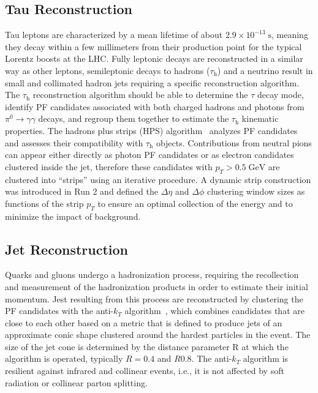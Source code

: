 \subsection{Tau Reconstruction}
\label{sec:tau_reco}

Tau leptons are characterized by a mean lifetime of about $2.9\times10^{-13}\;\text{s}$, meaning they decay within a few millimeters from their production point for the typical Lorentz boosts at the LHC. Fully leptonic decays are reconstructed in a similar way as other leptons, semileptonic decays to hadrons ($\tau_\text{h}$) and a neutrino result in small and collimated hadron jets requiring a specific reconstruction algorithm. The $\tau_\text{h}$ reconstruction algorithm should be able to determine the $\tau$ decay mode, identify PF candidates associated with both charged hadrons and photons from $\pi^0 \rightarrow \gamma\gamma$ decays, and regroup them together to estimate the $\tau_\text{h}$ kinematic properties. The hadrons plus strips (HPS) algorithm~\cite{CMS:2011eio,CMS:2015pac} analyzes PF candidates and assesses their compatibility with $\tau_\text{h}$ objects. Contributions from neutral pions can appear either directly as photon PF candidates or as electron candidates clustered inside the jet, therefore these candidates with $p_T > 0.5 \;\text{GeV}$ are clustered into ``strips'' using an iterative procedure. A dynamic strip construction was introduced in Run 2 and defined the $\Delta\eta$ and $\Delta\phi$ clustering window sizes as functions of the strip $p_T$ to ensure an optimal collection of the energy and to minimize the impact of background.


\subsection{Jet Reconstruction}
\label{sec:jet_reco}

Quarks and gluons undergo a hadronization process, requiring the recollection and measurement of the hadronization products in order to estimate their initial momentum. Jest resulting from this process are reconstructed by clustering the PF candidates with the anti-$k_T$ algorithm~\cite{Cacciari:2008gp,Cacciari:2011ma}, which combines candidates that are close to each other based on a metric that is defined to produce jets of an approximate conic shape clustered around the hardest particles in the event. The size of the jet cone is determined by the distance parameter R at which the algorithm is operated, typically $R=0.4$ and $R0.8$. The anti-$k_T$ algorithm is resilient against infrared and collinear events, i.e., it is not affected by soft radiation or collinear parton splitting. 

